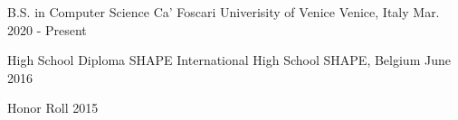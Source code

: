 

\begin{cventries}

  \cventry
    {B.S. in Computer Science} %
    {Ca' Foscari Univerisity of Venice} %
    {Venice, Italy} %
    {Mar. 2020 - Present} %
    {
    }

  \cventry
    {High School Diploma}
    {SHAPE International High School}
    {SHAPE, Belgium}
    {June 2016}
    {
      \begin{cvitems} %
        \item {Honor Roll 2015}
      \end{cvitems}
    }
\end{cventries}